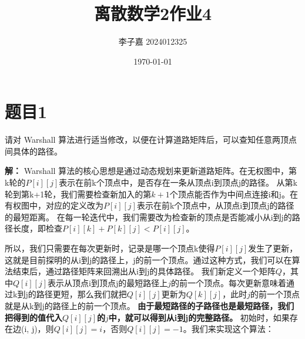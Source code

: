 \documentclass[utf8]{ctexart}
\title{\textbf{离散数学2\quad 作业4}}
\date{\today}
\author{李子嘉 2024012325}
\theoremstyle{mystyle}
\begin{document}
\maketitle

\section*{题目1}

\begin{problembox}
请对 Warshall 算法进行适当修改，以便在计算道路矩阵后，可以查知任意两顶点间具体的路径。
\end{problembox}

\textbf{解：} Warshall 算法的核心思想是通过动态规划来更新道路矩阵。在无权图中，第k轮的$P[i][j]$表示在前k个顶点中，是否存在一条从顶点i到顶点j的路径。
从第k轮到第k+1轮，我们需要检查新加入的第$k+1$个顶点能否作为中间点连接i和j。在有权图中，对应的定义改为$P[i][j]$表示在前k个顶点中，从顶点i到顶点j的路径的最短距离。
在每一轮迭代中，我们需要改为检查新的顶点是否能减小从i到j的路径长度，即检查$P[i][k] + P[k][j] < P[i][j]$。

所以，我们只需要在每次更新时，记录是哪一个顶点k使得$P[i][j]$发生了更新，这就是目前探明的从i到j的路径上，j的前一个顶点。通过这种方式，我们可以在算法结束后，通过路径矩阵来回溯出从i到j的具体路径。
我们新定义一个矩阵$Q$，其中$Q[i][j]$表示从顶点i到顶点j的最短路径上$j$的前一个顶点。每次更新意味着通过k到j的路径更短，那么我们就把$Q[i][j]$更新为$Q[k][j]$，此时$j$的前一个顶点就是从k到j的路径上的前一个顶点。
\textbf{由于最短路径的子路径也是最短路径，我们把得到的值代入$Q[i][j]$的$j$中，就可以得到从i到j的完整路径。}
初始时，如果存在边(i, j)，则$Q[i][j] = i$，否则$Q[i][j] = -1$。我们来实现这个算法：
\end{document}
